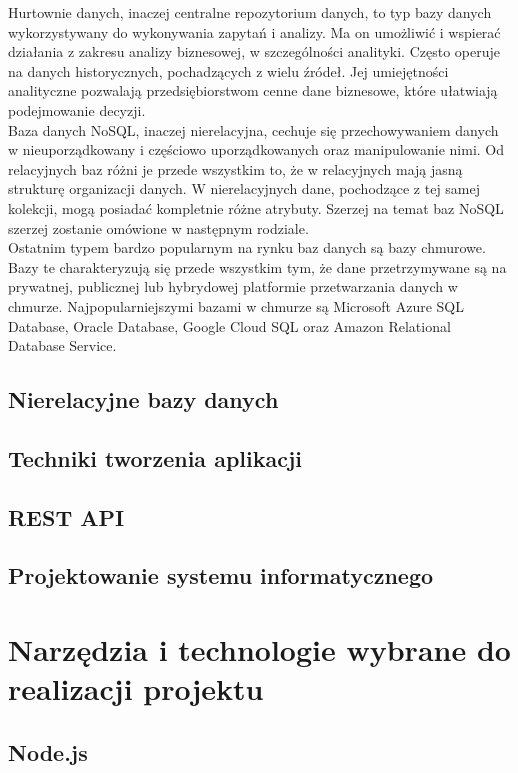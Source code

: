 \documentclass[12pt]{article}
\begin{document}
\begin{sloppypar}
{{  Hurtownie danych, inaczej centralne repozytorium danych, to typ bazy danych wykorzystywany do wykonywania zapytań i analizy. 
  Ma on umożliwić i wspierać działania z zakresu analizy biznesowej, w szczególności analityki. Często operuje na danych historycznych, pochadzących z wielu źródeł. 
  Jej umiejętności analityczne pozwalają przedsiębiorstwom cenne dane biznesowe, które ułatwiają podejmowanie decyzji.\cite{oracle-warehouse}\\
  Baza danych NoSQL, inaczej nierelacyjna, cechuje się przechowywaniem danych w nieuporządkowany i częściowo uporządkowanych oraz manipulowanie nimi. Od relacyjnych baz
  różni je przede wszystkim to, że w relacyjnych mają jasną strukturę organizacji danych. W nierelacyjnych dane, pochodzące z tej samej kolekcji, mogą posiadać 
  kompletnie różne atrybuty. Szerzej na temat baz NoSQL szerzej zostanie omówione w następnym rodziale.\\
  Ostatnim typem bardzo popularnym na rynku baz danych są bazy chmurowe. Bazy te charakteryzują się przede wszystkim tym, że dane przetrzymywane są na prywatnej,
  publicznej lub hybrydowej platformie przetwarzania danych w chmurze. 
  Najpopularniejszymi bazami w chmurze są Microsoft Azure SQL Database, Oracle Database, Google Cloud SQL oraz Amazon Relational Database Service.
}
\subsection{Nierelacyjne bazy danych}
{

}
\subsection{Techniki tworzenia aplikacji}
{

}
\subsection{REST API}
{

}
\subsection{Projektowanie systemu informatycznego}
{

}
}

\section{Narzędzia i technologie wybrane do realizacji projektu}
{
\subsection{Node.js}
{

}}
\end{sloppypar}
\end{document}
